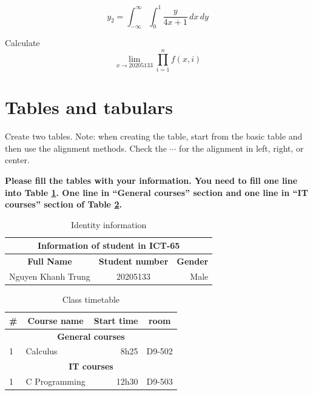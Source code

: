 \documentclass{article}
\begin{document}
		\begin{equation}
			y_2 = \int_{-\infty}^{\infty} \int_{0}^{1} \frac{y}{4x+1} \,dx \,dy
		\label{eq:3}
		\end{equation}
		
		Calculate
		\begin{displaymath}
			\lim_{x \to 20205133} \prod_{i=1}^{n} f(x,i)
		\end{displaymath}
	\section{Tables and tabulars}
		Create two tables. Note: when creating the table, start from the basic table
and then use the alignment methods. Check the $\cdots$ for the alignment in left,
right, or center.

		\textbf{Please fill the tables with your information. You need to fill one line into Table \ref{tab:1}. One line in ``General courses'' section and one line
in ``IT courses'' section of Table \ref{tab:2}.}
		\begin{table}[h]
		\centering
		\caption{Identity information}
			\begin{tabular}{|l|c|r|}
				\hline
				\multicolumn{3}{|c|}{\textbf{Information of student in ICT-65}}\\
				\hline
				\hline
				\multicolumn{1}{|c}{\textbf{Full Name}} & \multicolumn{1}{|c}{\textbf{Student number}} & \multicolumn{1}{|c|}{\textbf{Gender}}\\
				\hline
				Nguyen Khanh Trung & 20205133 & Male\\
				\hline
			\end{tabular}
		\label{tab:1}
		\end{table}
		
		\begin{table}[h]
		\centering
		\caption{Class timetable}
			\begin{tabular}{|l|l|r|r|}
				\hline
				\multicolumn{1}{|c}{\textbf{\#}} & \multicolumn{1}{|c}{\textbf{Course name}}& \multicolumn{1}{|c}{\textbf{Start time}} & \multicolumn{1}{|c|}{\textbf{room}}\\
				\hline
				\multicolumn{4}{|c|}{\textbf{General courses}}\\
				\hline
				1 & Calculus & 8h25 & D9-502\\
				\hline
				\multicolumn{4}{|c|}{\textbf{IT courses}}\\
				\hline
				1 & C Programming & 12h30 & D9-503\\
				\hline
			\end{tabular}
		\label{tab:2}
		\end{table}
		
\end{document}
